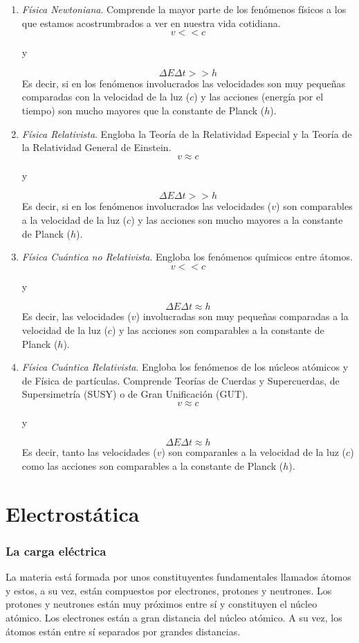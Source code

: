 \documentclass[11pt, oneside, titlepage]{article}
\begin{document}
\begin{enumerate}
\item \emph{Física Newtoniana}. Comprende la mayor parte de los fenómenos físicos a los que estamos acostrumbrados a ver en nuestra vida cotidiana.
\[v << c \] \begin{center}y\end{center} \[ \Delta E \Delta t >> h\]
Es decir, si en los fenómenos involucrados las velocidades son muy pequeñas comparadas con la velocidad de la luz ($c$) y las acciones (energía por el tiempo) son mucho mayores que la constante de Planck ($h$).
\item \emph{Física Relativista}. Engloba la Teoría de la Relatividad Especial y la Teoría de la Relatividad General de Einstein.
\[v \approx c\] \begin{center} y \end{center} \[\Delta E \Delta t >> h\]
Es decir, si en los fenómenos involucrados las velocidades ($v$) son comparables a la velocidad de la luz ($c$) y las acciones son mucho mayores a la constante de Planck ($h$).
\item \emph{Física Cuántica no Relativista}. Engloba los fenómenos químicos entre átomos.
\[v << c\] \begin{center} y \end{center} \[\Delta E \Delta t \approx h\]
Es decir, las velocidades ($v$) involucradas son muy pequeñas comparadas a la velocidad de la luz ($c$) y las acciones son comparables a la constante de Planck ($h$).
\item \emph{Física Cuántica Relativista}. Engloba los fenómenos de los núcleos atómicos y de Física de partículas. Comprende Teorías de Cuerdas y Supercuerdas, de Supersimetría (SUSY) o de Gran Unificación (GUT).
\[v \approx c\] \begin{center} y \end{center} \[\Delta E \Delta t \approx h\]
Es decir, tanto las velocidades ($v$) son comparanles a la velocidad de la luz ($c$) como las acciones son comparables a la constante de Planck ($h$). 
\end{enumerate}

\section{Electrostática}

\subsubsection{La carga eléctrica}
La materia está formada por unos constituyentes fundamentales llamados átomos y estos, a su vez, están compuestos por electrones, protones y neutrones. Los protones y neutrones están muy próximos entre sí y constituyen el núcleo atómico. Los electrones están a gran distancia del núcleo atómico. A su vez, los átomos están entre sí separados por grandes distancias.
\end{document}
